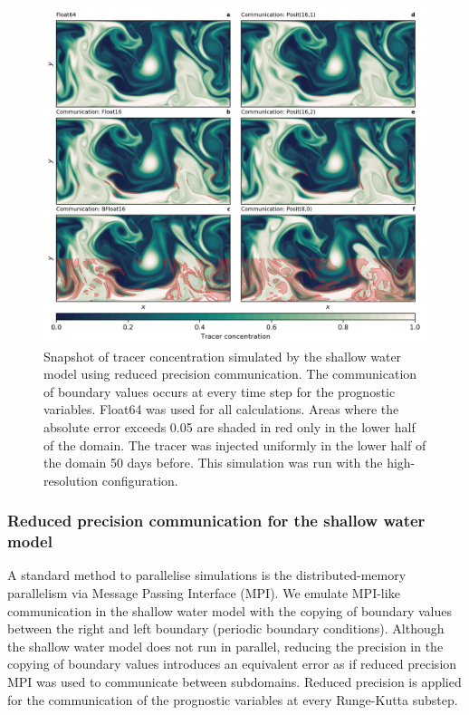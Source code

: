\documentclass[draft]{agujournal2019}
\begin{document}
\begin{figure}
\includegraphics[width=1\textwidth]{../plots/snapshot_comm.png}
\caption{Snapshot of tracer concentration simulated by the shallow water model using reduced precision communication. The communication of boundary values occurs at every time step for the prognostic variables. Float64 was used for all calculations. Areas where the absolute error exceeds 0.05 are shaded in red only in the lower half of the domain. The tracer was injected uniformly in the lower half of the domain 50 days before. This simulation was run with the high-resolution configuration.}
\label{fig:snapshot_comm}
\end{figure}


\subsubsection{Reduced precision communication for the shallow water model}
\label{sec:comm}

A standard method to parallelise simulations is the distributed-memory parallelism via Message Passing Interface (MPI). We emulate MPI-like communication in the shallow water model with the copying of boundary values between the right and left boundary (periodic boundary conditions). Although the shallow water model does not run in parallel, reducing the precision in the copying of boundary values introduces an equivalent error as if reduced precision MPI was used to communicate between subdomains. Reduced precision is applied for the communication of the prognostic variables at every Runge-Kutta substep.
\end{document}
